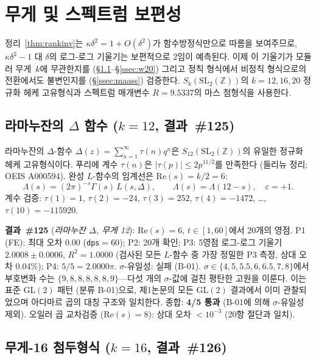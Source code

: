 \documentclass[11pt, a4paper]{article}
\theoremstyle{plain}
\theoremstyle{definition}
\begin{document}
\section{무게 및 스펙트럼 보편성}
\label{sec:modular}

정리~\ref{thm:rankinv}는 $\kappa\delta^{2}=1+O(\delta^{2})$가
함수방정식만으로 따름을 보여주므로,
$\kappa\delta^{2}-1$ 대 $\delta$의 로그-로그 기울기는 보편적으로 $2$임이
예측된다. 이제 이 기울기가 모듈러 무게~$k$에 무관한지를
(\S\ref{ssec:delta12}--\S\ref{ssec:w20})
그리고 정칙 형식에서 비정칙 형식으로의 전환에서도 불변인지를
(\S\ref{ssec:maass}) 검증한다.
$S_k(\mathrm{SL}_2(\mathbb{Z}))$의 $k=12,16,20$ 정규화 헤케 고유형식과
스펙트럼 매개변수 $R=9.5337$의 마스 첨형식을 사용한다.

\subsection{라마누잔의 $\Delta$ 함수 ($k=12$, 결과~\#125)}
\label{ssec:delta12}

라마누잔의 $\Delta$-함수 $\Delta(z)=\sum_{n=1}^{\infty}\tau(n)q^n$은
$S_{12}(\mathrm{SL}_2(\mathbb{Z}))$의 유일한 정규화 헤케 고유형식이다.
푸리에 계수 $\tau(n)$은 $|\tau(p)|\leq 2p^{11/2}$를 만족한다
(들리뉴 정리; OEIS A000594). 완성 $L$-함수의 임계선은 $\mathrm{Re}(s)=k/2=6$:
\[
  \Lambda(s) = (2\pi)^{-s}\Gamma(s)\,L(s,\Delta), \qquad
  \Lambda(s)=\Lambda(12-s), \quad \varepsilon=+1.
\]
계수 검증: $\tau(1)=1$, $\tau(2)=-24$, $\tau(3)=252$,
$\tau(4)=-1472$, \ldots, $\tau(10)=-115920$.

\medskip
\noindent\textbf{결과~\#125} (\textit{라마누잔 $\Delta$, 무게 12}):
$\mathrm{Re}(s)=6$, $t\in[1,60]$에서 20개의 영점.
P1 (FE): 최대 오차 $0.00$ (\texttt{dps}$=60$); P2: 20개 확인;
P3: 5영점 로그-로그 기울기 $\mathbf{2.0008\pm 0.0006}$, $R^{2}=1.0000$
(검사된 모든 $L$-함수 중 가장 정밀한 P3 측정, 상대 오차 $0.04\%$);
P4: $5/5=2.0000\pi$.
$\sigma$-유일성: 실패 (B-01). $\sigma\in\{4,5,5.5,6,6.5,7,8\}$에서
부호변화 수는 $\{9,8,8,8,8,8,9\}$---다섯 개의 $\sigma$-값에 걸친 평탄한
고원을 이룬다. 이는 표준 $\mathrm{GL}(2)$ 패턴 (분류 B-01)으로,
제1논문의 모든 $\mathrm{GL}(2)$ 결과에서 이미 관찰되었으며
아다마르 곱의 대칭 구조와 일치한다. 종합: \textbf{4/5 통과}
(B-01에 의해 $\sigma$-유일성 제외). 오일러 곱 교차검증
($\mathrm{Re}(s)=8$): 상대 오차 $<10^{-3}$ (20항 절단과 일치).

\subsection{무게-16 첨두형식 ($k=16$, 결과~\#126)}
\label{ssec:w16}
\end{document}
